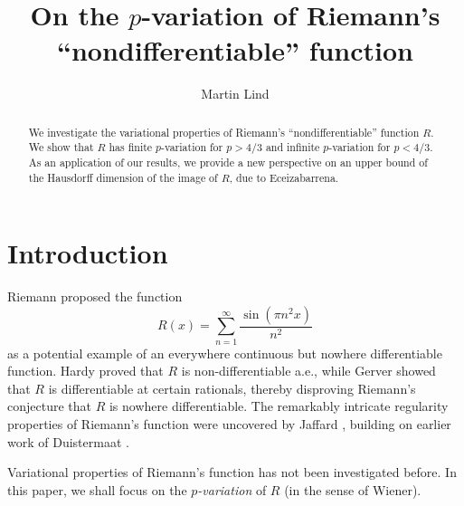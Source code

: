 \documentclass{amsart}
\title[$p$-variation of Riemann's function]{On the $p$-variation of Riemann's ``nondifferentiable'' function}
\author{Martin Lind}
\numberwithin{equation}{section}
\begin{document}
\begin{abstract}
    We investigate the variational properties of Riemann's ``nondifferentiable'' function $R$. We show that $R$ has finite $p$-variation for $p>4/3$ and infinite $p$-variation for  $p<4/3$. As an application of our results, we provide a new perspective on an upper bound of the Hausdorff dimension of the image of $R$, due to Eceizabarrena.
\end{abstract}
\maketitle

\section{Introduction}
Riemann proposed the function
\begin{equation}
    \label{riemann}
    R(x)=\sum_{n=1}^\infty\frac{\sin(\pi n^2x)}{n^2}
\end{equation}
as a potential example of an everywhere continuous but nowhere differentiable function. Hardy \cite{Ha1916} proved that $R$ is non-differentiable a.e., while Gerver \cite{Ge70} showed that $R$ is differentiable at certain rationals, thereby disproving Riemann's conjecture that $R$ is nowhere differentiable. The remarkably intricate regularity properties of Riemann's function were uncovered by Jaffard \cite{Ja96}, building on earlier work of Duistermaat \cite{Du91}.

Variational properties of Riemann's function has not been investigated before. In this paper, we shall focus on the \emph{$p$-variation} of $R$ (in the sense of Wiener).
\end{document}
